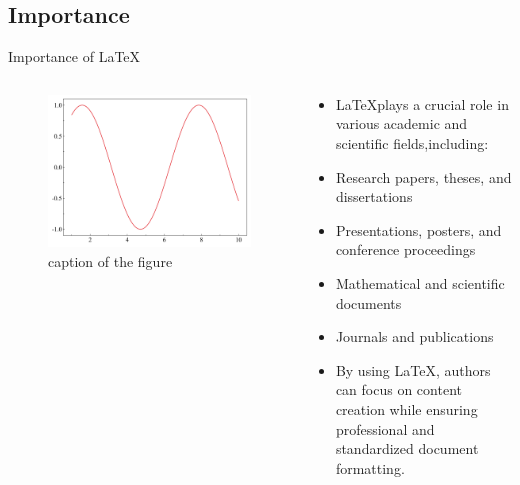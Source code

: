\documentclass{SUSTechBeamer}
\begin{document}
\subsection{Importance}
\begin{frame}{Importance of \LaTeX}
    \begin{columns}
        \begin{column}{0.5\textwidth}
            \begin{figure}[h]
                \centering
                \includegraphics[width=\linewidth]{demo_fig/pdffig.pdf}
                \caption{caption of the figure}
                \label{fig:fig1}
            \end{figure}
        \end{column}
    \begin{column}{0.5\textwidth}
        \begin{itemize}
          \item \LaTeX plays a crucial role in various academic and scientific fields,including:
          \item Research papers, theses, and dissertations
          \item Presentations, posters, and conference proceedings
          \item Mathematical and scientific documents
          \item Journals and publications
          \item By using \LaTeX, authors can focus on content creation while ensuring professional and standardized document formatting.
        \end{itemize}
    \end{column}
\end{columns}
\end{frame}
\end{document}
